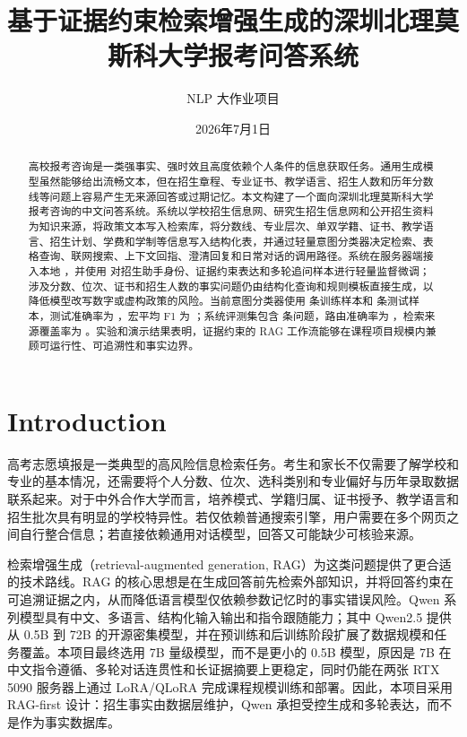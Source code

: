 \documentclass[UTF8,a4paper,11pt]{ctexart}
\title{基于证据约束检索增强生成的深圳北理莫斯科大学报考问答系统}
\author{NLP 大作业项目}
\date{2026年7月1日}
\begin{document}
\maketitle

\begin{abstract}
高校报考咨询是一类强事实、强时效且高度依赖个人条件的信息获取任务。通用生成模型虽然能够给出流畅文本，但在招生章程、专业证书、教学语言、招生人数和历年分数线等问题上容易产生无来源回答或过期记忆。本文构建了一个面向深圳北理莫斯科大学报考咨询的中文问答系统。系统以学校招生信息网、研究生招生信息网和公开招生资料为知识来源，将政策文本写入检索库，将分数线、专业层次、单双学籍、证书、教学语言、招生计划、学费和学制等信息写入结构化表，并通过轻量意图分类器决定检索、表格查询、联网搜索、上下文回指、澄清回复和日常对话的调用路径。系统在服务器端接入本地 \QwenFineTuneModel，并使用 \QwenFineTuneMethod 对招生助手身份、证据约束表达和多轮追问样本进行轻量监督微调；涉及分数、位次、证书和招生人数的事实问题仍由结构化查询和规则模板直接生成，以降低模型改写数字或虚构政策的风险。当前意图分类器使用 \IntentTrainSize 条训练样本和 \IntentTestSize 条测试样本，测试准确率为 \IntentAccuracy，宏平均 F1 为 \IntentMacroFone；系统评测集包含 \EvalQuestionCount 条问题，路由准确率为 \EvalRouterAccuracy，检索来源覆盖率为 \EvalSourceCoverage。实验和演示结果表明，证据约束的 RAG 工作流能够在课程项目规模内兼顾可运行性、可追溯性和事实边界。
\end{abstract}

\section{Introduction}

高考志愿填报是一类典型的高风险信息检索任务。考生和家长不仅需要了解学校和专业的基本情况，还需要将个人分数、位次、选科类别和专业偏好与历年录取数据联系起来。对于中外合作大学而言，培养模式、学籍归属、证书授予、教学语言和招生批次具有明显的学校特异性。若仅依赖普通搜索引擎，用户需要在多个网页之间自行整合信息；若直接依赖通用对话模型，回答又可能缺少可核验来源。

检索增强生成（retrieval-augmented generation, RAG）为这类问题提供了更合适的技术路线。RAG 的核心思想是在生成回答前先检索外部知识，并将回答约束在可追溯证据之内，从而降低语言模型仅依赖参数记忆时的事实错误风险\cite{lewis2020rag}。Qwen 系列模型具有中文、多语言、结构化输入输出和指令跟随能力；其中 Qwen2.5 提供从 0.5B 到 72B 的开源密集模型，并在预训练和后训练阶段扩展了数据规模和任务覆盖\cite{qwen2024technical,qwen25modelcard}。本项目最终选用 7B 量级模型，而不是更小的 0.5B 模型，原因是 7B 在中文指令遵循、多轮对话连贯性和长证据摘要上更稳定，同时仍能在两张 RTX 5090 服务器上通过 LoRA/QLoRA 完成课程规模训练和部署。因此，本项目采用 RAG-first 设计：招生事实由数据层维护，Qwen 承担受控生成和多轮表达，而不是作为事实数据库。
\end{document}
